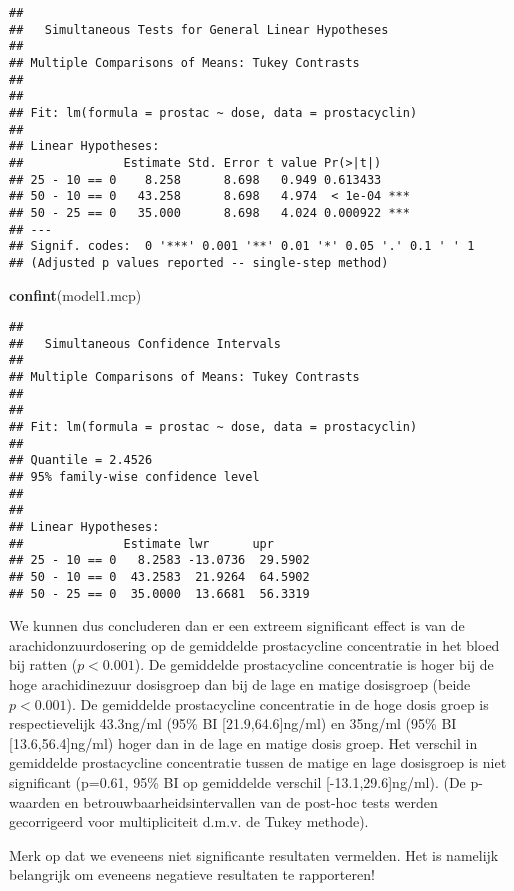 \documentclass[12pt,dutch,coursenotes]{book}
\newenvironment{Shaded}{\begin{snugshade}}{\end{snugshade}}
\newcommand{\KeywordTok}[1]{\textcolor[rgb]{0.13,0.29,0.53}{\textbf{#1}}}
\newcommand{\NormalTok}[1]{#1}
\theoremstyle{definition}
\theoremstyle{definition}
\theoremstyle{definition}
\theoremstyle{remark}
\begin{document}
\begin{verbatim}
## 
##   Simultaneous Tests for General Linear Hypotheses
## 
## Multiple Comparisons of Means: Tukey Contrasts
## 
## 
## Fit: lm(formula = prostac ~ dose, data = prostacyclin)
## 
## Linear Hypotheses:
##              Estimate Std. Error t value Pr(>|t|)    
## 25 - 10 == 0    8.258      8.698   0.949 0.613433    
## 50 - 10 == 0   43.258      8.698   4.974  < 1e-04 ***
## 50 - 25 == 0   35.000      8.698   4.024 0.000922 ***
## ---
## Signif. codes:  0 '***' 0.001 '**' 0.01 '*' 0.05 '.' 0.1 ' ' 1
## (Adjusted p values reported -- single-step method)
\end{verbatim}

\begin{Shaded}
\begin{Highlighting}[]
\KeywordTok{confint}\NormalTok{(model1.mcp)}
\end{Highlighting}
\end{Shaded}

\begin{verbatim}
## 
##   Simultaneous Confidence Intervals
## 
## Multiple Comparisons of Means: Tukey Contrasts
## 
## 
## Fit: lm(formula = prostac ~ dose, data = prostacyclin)
## 
## Quantile = 2.4526
## 95% family-wise confidence level
##  
## 
## Linear Hypotheses:
##              Estimate lwr      upr     
## 25 - 10 == 0   8.2583 -13.0736  29.5902
## 50 - 10 == 0  43.2583  21.9264  64.5902
## 50 - 25 == 0  35.0000  13.6681  56.3319
\end{verbatim}

We kunnen dus concluderen dan er een extreem significant effect is van
de arachidonzuurdosering op de gemiddelde prostacycline concentratie in
het bloed bij ratten (\(p<0.001\)). De gemiddelde prostacycline
concentratie is hoger bij de hoge arachidinezuur dosisgroep dan bij de
lage en matige dosisgroep (beide \(p<0.001\)). De gemiddelde
prostacycline concentratie in de hoge dosis groep is respectievelijk
43.3ng/ml (95\% BI {[}21.9,64.6{]}ng/ml) en 35ng/ml (95\% BI
{[}13.6,56.4{]}ng/ml) hoger dan in de lage en matige dosis groep. Het
verschil in gemiddelde prostacycline concentratie tussen de matige en
lage dosisgroep is niet significant (p=0.61, 95\% BI op gemiddelde
verschil {[}-13.1,29.6{]}ng/ml). (De p-waarden en
betrouwbaarheidsintervallen van de post-hoc tests werden gecorrigeerd
voor multipliciteit d.m.v. de Tukey methode).

Merk op dat we eveneens niet significante resultaten vermelden. Het is
namelijk belangrijk om eveneens negatieve resultaten te rapporteren!
\end{document}
